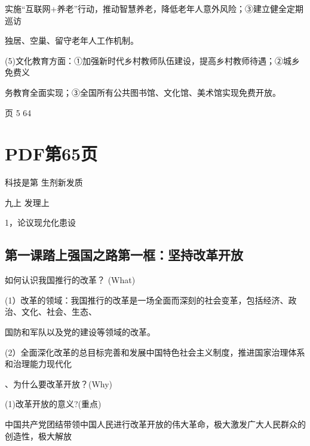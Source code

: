 \documentclass[lang=cn,11pt]{elegantbook}
\newcommand{\daofasym}[1]{{\daofasymbolfont #1}}
\newcommand{\daofasym}[1]{#1}
\begin{document}
实施“互联网+养老”行动，推动智慧养老，降低老年人意外风险；\daofasym{③}建立健全定期巡访\par

独居、空巢、留守老年人工作机制。\par

(5)文化教育方面：\daofasym{①}加强新时代乡村教师队伍建设，提高乡村教师待遇；\daofasym{②}城乡免费义\par

务教育全面实现；\daofasym{③}全国所有公共图书馆、文化馆、美术馆实现免费开放。\par

页 5 64\par


\section*{PDF第65页}

科技是第 生剂新发质\par

九上 发理上\par

1，论议现允化患设\par

\subsection*{第一课踏上强国之路第一框：坚持改革开放}

如何认识我国推行的改革？ (What)\par

(1）改革的领域：我国推行的改革是一场全面而深刻的社会变革，包括经济、政治、文化、社会、生态、\par

国防和军队以及党的建设等领域的改革。\par

(2）全面深化改革的总目标完善和发展中国特色社会主义制度，推进国家治理体系和治理能力现代化\par

、为什么要改革开放？(Why)\par

(1)改革开放的意义?(重点)\par

中国共产党团结带领中国人民进行改革开放的伟大革命，极大激发广大人民群众的创造性，极大解放\par
\end{document}

